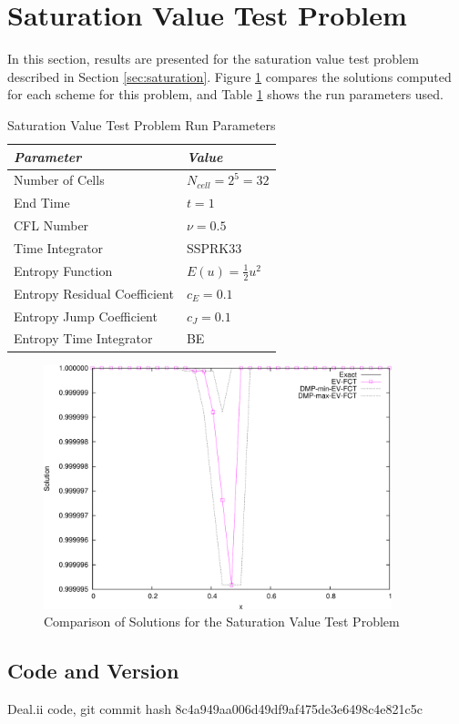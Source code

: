 \section{Saturation Value Test Problem}

In this section, results are presented for the saturation value test
problem described in Section \ref{sec:saturation}.
Figure \ref{fig:saturation} compares the solutions computed
for each scheme for this problem, and
Table \ref{tab:saturation_run_parameters} shows the run parameters used.
\begin{table}[h]\caption{Saturation Value Test Problem Run Parameters}
\label{tab:saturation_run_parameters}
\centering
\begin{tabular}{l l}\toprule
\emph{Parameter} & \emph{Value}\\\midrule
Number of Cells & $N_{cell} = 2^5 = 32$\\
End Time & $t = 1$\\
CFL Number & $\nu = 0.5$\\
Time Integrator & SSPRK33\\\midrule
Entropy Function & $E(u) = \frac{1}{2}u^2$\\
Entropy Residual Coefficient & $c_E = 0.1$\\
Entropy Jump Coefficient & $c_J = 0.1$\\
Entropy Time Integrator & BE\\
\bottomrule\end{tabular}
\end{table}
\begin{figure}[h]
   \centering
   \includegraphics[width=0.9\textwidth]{saturation/saturation.pdf}
   \caption{Comparison of Solutions for the Saturation Value Test Problem}
   \label{fig:saturation}
\end{figure}
\subsection{Code and Version}
Deal.ii code, git commit hash 8c4a949aa006d49df9af475de3e6498c4e821c5c
